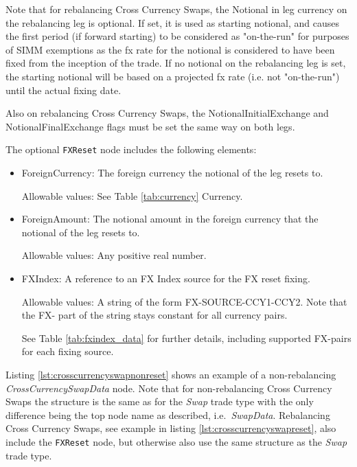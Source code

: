Note that for rebalancing Cross Currency Swaps, the Notional in leg currency on the rebalancing leg is optional. If set, it is used as starting notional, and causes the first period (if forward starting)  to be considered as "on-the-run" for purposes of SIMM exemptions as the fx rate for the notional is considered to have been fixed from the inception of the trade. If no notional on the rebalancing leg is set, the starting notional will be based on a projected fx rate (i.e. not "on-the-run") until the actual fixing date.

Also on rebalancing Cross Currency Swaps, the NotionalInitialExchange and NotionalFinalExchange flags must be set the same way on both legs.

The optional \lstinline!FXReset! node includes the following elements:

\begin{itemize}

\item ForeignCurrency: The foreign currency the notional of the leg resets to.  

Allowable values:  See Table \ref{tab:currency} Currency.

\item ForeignAmount: The notional amount in the foreign currency that the notional of the leg resets to.  

Allowable values:  Any positive real number.

\item FXIndex: A reference to an FX Index source for the FX reset fixing. 

Allowable values:  A string of the form FX-SOURCE-CCY1-CCY2. Note that the FX- part of the string stays constant for all currency pairs.

See Table \ref{tab:fxindex_data} for further details, including supported FX-pairs for each fixing source.

\end{itemize}

Listing \ref{lst:crosscurrencyswapnonreset} shows an example of a non-rebalancing \emph{CrossCurrencySwapData} node. Note that for non-rebalancing Cross Currency Swaps the structure is the same as for the \emph{Swap} trade type with the only difference being the top node name as described, i.e.\ \emph{SwapData}. Rebalancing Cross Currency Swaps, see example in listing \ref{lst:crosscurrencyswapreset}, also include the \lstinline!FXReset! node, but otherwise also use the same structure as the \emph{Swap} trade type.

